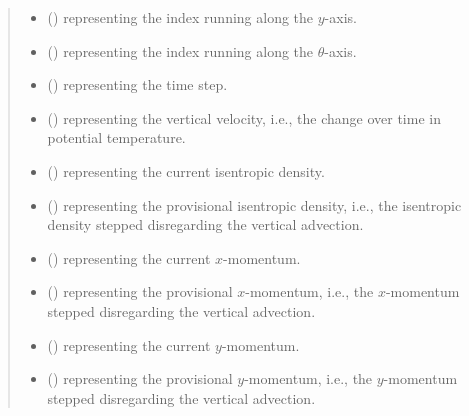 \documentclass[letterpaper,10pt,english]{sphinxmanual}
\begin{document}
\begin{fulllineitems}
\begin{fulllineitems}
\begin{quote}
\begin{description}
\begin{itemize}
\item {} 
 () \textendash{}  representing the index running along the \(y\)-axis.

\item {} 
 () \textendash{}  representing the index running along the \(\theta\)-axis.

\item {} 
 () \textendash{}  representing the time step.

\item {} 
 () \textendash{}  representing the vertical velocity,
i.e., the change over time in potential temperature.

\item {} 
 () \textendash{}  representing the current isentropic density.

\item {} 
 () \textendash{}  representing the provisional isentropic density,
i.e., the isentropic density stepped disregarding the vertical advection.

\item {} 
 () \textendash{}  representing the current \(x\)-momentum.

\item {} 
 () \textendash{}  representing the provisional \(x\)-momentum,
i.e., the \(x\)-momentum stepped disregarding the vertical advection.

\item {} 
 () \textendash{}  representing the current \(y\)-momentum.

\item {} 
 () \textendash{}  representing the provisional \(y\)-momentum,
i.e., the \(y\)-momentum stepped disregarding the vertical advection.


\end{itemize}
\end{description}
\end{quote}
\end{fulllineitems}
\end{fulllineitems}
\end{document}
